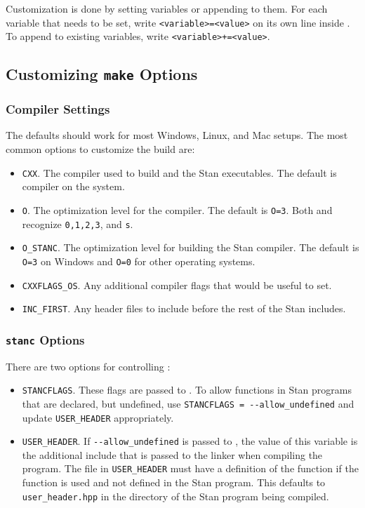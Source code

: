 Customization is done by setting variables or appending to them. For
each variable that needs to be set, write \Verb|<variable>=<value>| on
its own line inside . To append to existing
variables, write \Verb|<variable>+=<value>|.

\subsection{Customizing {\tt make} Options}

\subsubsection{Compiler Settings}

The defaults should work for most Windows, Linux, and Mac setups. The most common options to customize the build are:
%
\begin{itemize}
  \item \Verb|CXX|. The compiler used to build \CmdStan and the Stan
    executables. The default is \Cpp compiler on the system.
  \item \Verb|O|. The optimization level for the compiler. The default
    is \Verb|O=3|. Both \gpp and \clang recognize \Verb|0,1,2,3|, and
    \Verb|s|.
  \item \Verb|O_STANC|. The optimization level for building the Stan compiler.
    The default is \Verb|O=3| on Windows and \Verb|O=0| for other operating systems.
  \item \Verb|CXXFLAGS_OS|. Any additional compiler flags that would be useful to set.
  \item \Verb|INC_FIRST|. Any header files to include before the rest of the Stan includes.
\end{itemize}

\subsubsection{{\tt stanc} Options}

There are two options for controlling \stanc:
%
\begin{itemize}
\item \Verb|STANCFLAGS|. These flags are passed to \stanc.  To allow
  functions in Stan programs that are declared, but undefined, use
  \Verb|STANCFLAGS = --allow_undefined| and update \Verb|USER_HEADER|
  appropriately.
\item \Verb|USER_HEADER|. If \Verb|--allow_undefined| is passed to
  \stanc, the value of this variable is the additional include that is
  passed to the \Cpp linker when compiling the program. The file in
  \Verb|USER_HEADER| must have a definition of the function if the function
  is used and not defined in the Stan program. This defaults to
  \Verb|user_header.hpp| in the directory of the Stan program being compiled.
\end{itemize}
%


